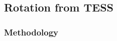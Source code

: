 \documentclass[12pt,twocolumn,tighten]{aastex63}
\begin{document}
\subsection{Rotation from TESS}
\label{subsec:tess}

\subsubsection{Methodology}
\label{subsubsec:cluster}

\begin{figure}[t]
	\begin{center}
		\leavevmode


\end{center}
\end{figure}
\end{document}
